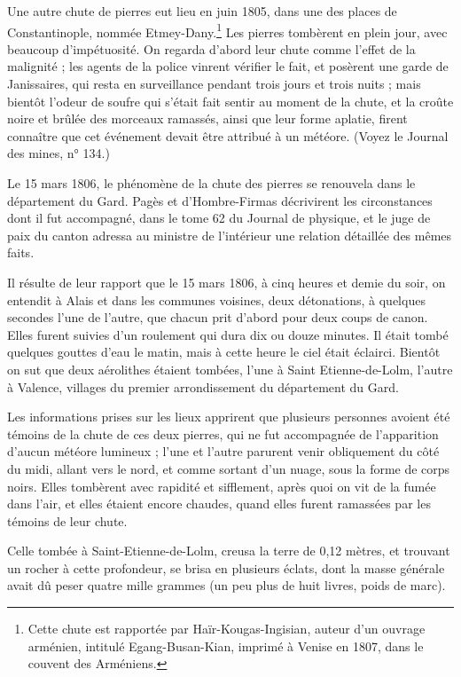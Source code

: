 \documentclass[a4paper, 12pt, oneside, french]{article}
\begin{document}
Une autre chute de pierres eut lieu en juin 1805, dans une des places de Constantinople, nommée Etmey-Dany.\footnote{Cette chute est rapportée par Haïr-Kougas-Ingisian, auteur d'un ouvrage arménien, intitulé Egang-Busan-Kian, imprimé à Venise en 1807, dans le couvent des Arméniens.} Les pierres tombèrent en plein jour, avec beaucoup d'impétuosité. On regarda d'abord leur chute comme l'effet de la malignité ; les agents de la police vinrent vérifier le fait, et posèrent une garde de Janissaires, qui resta en surveillance pendant trois jours et trois nuits ; mais bientôt l'odeur de soufre qui s'était fait sentir au moment de la chute, et la croûte noire et brûlée des morceaux ramassés, ainsi que leur forme aplatie, firent connaître que cet événement devait être attribué à un météore. (Voyez le Journal des mines, n° 134.)

Le 15 mars 1806, le phénomène de la chute des pierres se renouvela dans le département du Gard. Pagès et d'Hombre-Firmas décrivirent les circonstances dont il fut accompagné, dans le tome 62 du Journal de physique, et le juge de paix du canton adressa au ministre de l'intérieur une relation détaillée des mêmes faits.

Il résulte de leur rapport que le 15 mars 1806, à cinq heures et demie du soir, on entendit à Alais et dans les communes voisines, deux détonations, à quelques secondes l'une de l'autre, que chacun prit d'abord pour deux coups de canon. Elles furent suivies d'un roulement qui dura dix ou douze minutes. Il était tombé quelques gouttes d'eau le matin, mais à cette heure le ciel était éclairci. Bientôt on sut que deux aérolithes étaient tombées, l'une à Saint Etienne-de-Lolm, l'autre à Valence, villages du premier arrondissement du département du Gard.

Les informations prises sur les lieux apprirent que plusieurs personnes avoient été témoins de la chute de ces deux pierres, qui ne fut accompagnée de l'apparition d'aucun météore lumineux ; l'une et l'autre parurent venir obliquement du côté du midi, allant vers le nord, et comme sortant d'un nuage, sous la forme de corps noirs. Elles tombèrent avec rapidité et sifflement, après quoi on vit de la fumée dans l'air, et elles étaient encore chaudes, quand elles furent ramassées par les témoins de leur chute.

Celle tombée à Saint-Etienne-de-Lolm, creusa la terre de 0,12 mètres, et trouvant un rocher à cette profondeur, se brisa en plusieurs éclats, dont la masse générale avait dû peser quatre mille grammes (un peu plus de huit livres, poids de marc).
\end{document}
